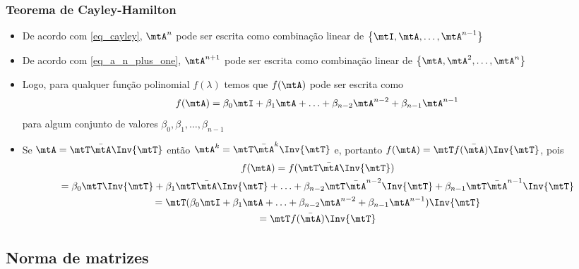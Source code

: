 \begin{frame}
  \frametitle{Teorema de Cayley-Hamilton}
  \begin{itemize}
    \item De acordo com \eqref{eq_cayley}, $\mtA^{n}$ pode ser escrita como combinação linear de $\left\{\mtI, \mtA, \ldots, \mtA^{n-1}\right\}$
    \item De acordo com \eqref{eq_a_n_plus_one}, $\mtA^{n+1}$ pode ser escrita como combinação linear de $\left\{\mtA, \mtA^2, \ldots, \mtA^n\right\}$
    \item Logo, para qualquer função polinomial $f(\lambda)$ temos que $f(\mtA)$ pode ser escrita como
    \begin{equation}
      f(\mtA) = \beta_{0}\mtI + \beta_{1}\mtA + \ldots + \beta_{n-2}\mtA^{n-2} + \beta_{n-1}\mtA^{n-1}
    \end{equation}
    para algum conjunto de valores $\beta_0, \beta_1, \ldots, \beta_{n-1}$
    \item Se $\mtA = \mtT\bar{\mtA}\Inv{\mtT}$ então $\mtA^k = \mtT\bar{\mtA}^k\Inv{\mtT}$ e, portanto $ f(\mtA) = \mtT f(\bar{\mtA})\Inv{\mtT} $, pois
    \begin{multline*}
      f(\mtA) = f(\mtT\bar{\mtA}\Inv{\mtT}) \\ 
      = \beta_{0}\mtT \Inv{\mtT} + \beta_{1}\mtT \bar{\mtA} \Inv{\mtT} + \ldots + \beta_{n-2}\mtT\bar{\mtA}^{n-2}\Inv{\mtT} + \beta_{n-1}\mtT \bar{\mtA}^{n-1} \Inv{\mtT} \\
      = \mtT(\beta_{0}\mtI + \beta_{1}\mtA + \ldots + \beta_{n-2}\mtA^{n-2} + \beta_{n-1}\mtA^{n-1})\Inv{\mtT} \\
      = \mtT f(\bar{\mtA})\Inv{\mtT}
    \end{multline*}
  \end{itemize}
\end{frame}

\subsection{Norma de matrizes}

